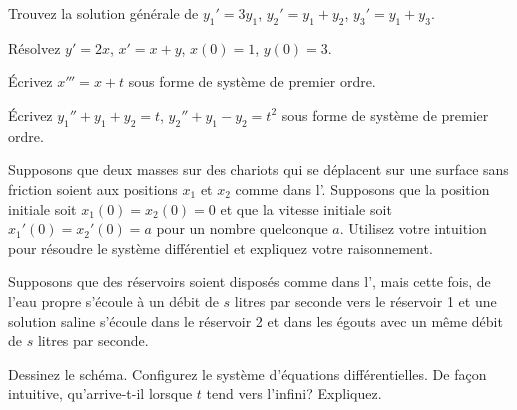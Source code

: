 \setcounter{exercise}{100}

\begin{exercise}
Trouvez la solution générale de $y_1' = 3 y_1$, $y_2' = y_1 + y_2$,
$y_3' = y_1 + y_3$.
\end{exercise}

\begin{exercise}
Résolvez $y'=2x$, $x'=x+y$, $x(0)=1$, $y(0)=3$.
\end{exercise}

\begin{exercise}
Écrivez $x''' = x+t$ sous forme de système de premier ordre.
\end{exercise}

\begin{exercise}
Écrivez $y_1'' + y_1 + y_2 = t$, 
$y_2'' + y_1 - y_2 = t^2$ sous forme de système de premier ordre.
\end{exercise}

\begin{exercise}
Supposons que deux masses sur des chariots qui se déplacent sur une surface sans friction soient aux positions $x_1$ et $x_2$ comme dans l'.
Supposons que la position initiale soit $x_1(0)=x_2(0)=0$ et que la vitesse initiale soit $x_1'(0) = x_2'(0) = a$ pour un nombre quelconque $a$.
Utilisez votre intuition pour résoudre le système différentiel et expliquez votre raisonnement.
\end{exercise}

\begin{exercise}
Supposons que des réservoirs soient disposés comme dans l’, mais cette fois, de l’eau propre s'écoule à un débit de $s$ litres par seconde vers le réservoir 1 et une solution saline s’écoule dans le réservoir 2 et dans les égouts avec un même débit de $s$ litres par seconde.
\begin{tasks}
\task Dessinez le schéma.
\task Configurez le système d’équations différentielles.
\task De façon intuitive, qu’arrive-t-il lorsque $t$ tend vers l’infini? Expliquez.
\end{tasks}
\end{exercise}


